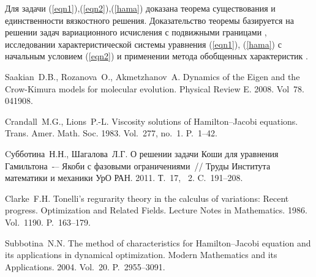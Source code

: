 Для задачи (\ref{eqn1}),(\ref{eqn2}),(\ref{hama}) доказана теорема существования и единственности вязкостного решения. Доказательство теоремы базируется на решении задач вариационного исчисления с подвижными границами \cite{Clarke}, исследовании характеристической системы уравнения (\ref{eqn1}), (\ref{hama}) с начальным условием (\ref{eqn2}) и применении метода обобщенных характеристик \cite{Subbotina}.





%

\begin{thebibliography}{9} %

 Saakian~D.B., Rozanova~O., Akmetzhanov~A. Dynamics of the Eigen and the Crow-Kimura models for molecular
evolution. Physical Review E. 2008. Vol~78. 041908.

 Crandall~M.G., Lions~P.-L. Viscosity solutions of Hamilton–Jacobi equations. Trans. Amer. Math. Soc.  1983. Vol.~277, no.~1. P.~1--42.

 Cубботина~Н.Н., Шагалова~Л.Г. О решении задачи Коши для уравнения Гамильтона~-– Якоби с фазовыми ограничениями~// Труды Института математики и механики УрО РАН. 2011.  Т.~17, \textnumero~2. C.~191--208.
    
 Clarke~F.H. Tonelli’s regurarity theory in the calculus of variations: Recent progress. Optimization and Related Fields. Lecture Notes in Mathematics. 1986. Vol.~1190. P.~163--179.
    
 Subbotina~N.N. The method of characteristics for Hamilton–Jacobi equation and its applications in dynamical optimization. Modern Mathematics and its Applications.  2004.  Vol.~20. P.~2955--3091.
    

\end{thebibliography}




%


